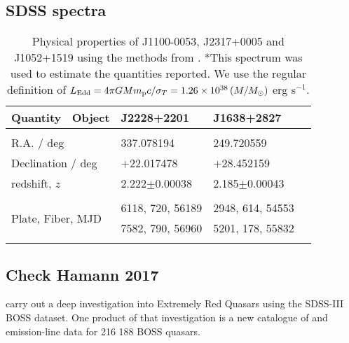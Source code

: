 \documentclass[a4paper,fleqn,usenatbib]{mnras}
\begin{document}
\subsection{SDSS spectra}
\begin{table}
 \centering
 \begin{tabular}{l l l l}
  \hline \hline 
   Quantity \ Object                           & J2228+2201     &  J1638+2827 \\
 \hline 
    &&\\
    R.A. / deg                                        &    337.078194      &  249.720559\\
    Declination / deg                            &    +22.017478      &  +28.452159 \\
    redshift, $z$                                    &   2.222$\pm$0.00038   &  2.185$\pm$0.00043          \\
    &&\\ 
    \multirow{2}{*}{Plate, Fiber, MJD}   & 6118, 720, 56189	     &  2948, 614, 54553	  \\
                                                          & 7582, 790, 56960	     & 5201, 178, 55832 \\    
    &&\\
    \hline \hline 
  \end{tabular}
  \caption{Physical properties of J1100-0053, J2317+0005 and J1052+1519 using the
    methods from \citet{Shen2011}. *This spectrum was used to estimate
    the quantities reported.  We use the regular definition of $L_{\rm
      Edd} = 4 \pi G M m_{\rm p} c /\sigma_{T} =
    1.26\times10^{38}\left (M/M_{\odot} \right )$ erg s$^{-1}$.} 
 \label{tab:Shen_props}
\end{table}


\subsection{Check Hamann 2017}
\citet{Hamann2017} carry out a deep investigation into Extremely Red Quasars \citep[ERQs;][]{Ross2015, Zakamska2016} using the SDSS-III BOSS dataset. One product of that investigation is a new catalogue of \civ and \nv emission-line data for 216 188 BOSS quasars. %
\end{document}
